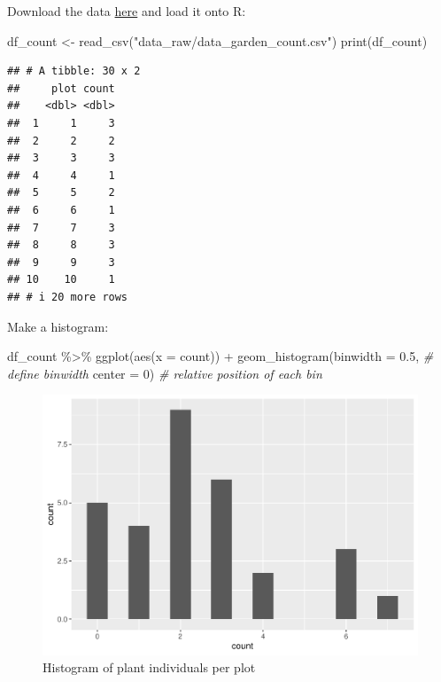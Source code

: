 \documentclass[
]{book}
\newenvironment{Shaded}{\begin{snugshade}}{\end{snugshade}}
\newcommand{\AttributeTok}[1]{\textcolor[rgb]{0.77,0.63,0.00}{#1}}
\newcommand{\CommentTok}[1]{\textcolor[rgb]{0.56,0.35,0.01}{\textit{#1}}}
\newcommand{\DecValTok}[1]{\textcolor[rgb]{0.00,0.00,0.81}{#1}}
\newcommand{\FloatTok}[1]{\textcolor[rgb]{0.00,0.00,0.81}{#1}}
\newcommand{\FunctionTok}[1]{\textcolor[rgb]{0.00,0.00,0.00}{#1}}
\newcommand{\NormalTok}[1]{#1}
\newcommand{\OtherTok}[1]{\textcolor[rgb]{0.56,0.35,0.01}{#1}}
\newcommand{\SpecialCharTok}[1]{\textcolor[rgb]{0.00,0.00,0.00}{#1}}
\newcommand{\StringTok}[1]{\textcolor[rgb]{0.31,0.60,0.02}{#1}}
\begin{document}
Download the data \href{https://github.com/aterui/biostats/blob/master/data_raw/data_garden_count.csv}{here} and load it onto R:

\begin{Shaded}
\begin{Highlighting}[]
\NormalTok{df\_count }\OtherTok{\textless{}{-}} \FunctionTok{read\_csv}\NormalTok{(}\StringTok{"data\_raw/data\_garden\_count.csv"}\NormalTok{)}
\FunctionTok{print}\NormalTok{(df\_count)}
\end{Highlighting}
\end{Shaded}

\begin{verbatim}
## # A tibble: 30 x 2
##     plot count
##    <dbl> <dbl>
##  1     1     3
##  2     2     2
##  3     3     3
##  4     4     1
##  5     5     2
##  6     6     1
##  7     7     3
##  8     8     3
##  9     9     3
## 10    10     1
## # i 20 more rows
\end{verbatim}

Make a histogram:

\begin{Shaded}
\begin{Highlighting}[]
\NormalTok{df\_count }\SpecialCharTok{\%\textgreater{}\%} 
  \FunctionTok{ggplot}\NormalTok{(}\FunctionTok{aes}\NormalTok{(}\AttributeTok{x =}\NormalTok{ count)) }\SpecialCharTok{+}
  \FunctionTok{geom\_histogram}\NormalTok{(}\AttributeTok{binwidth =} \FloatTok{0.5}\NormalTok{, }\CommentTok{\# define binwidth}
                 \AttributeTok{center =} \DecValTok{0}\NormalTok{) }\CommentTok{\# relative position of each bin}
\end{Highlighting}
\end{Shaded}

\begin{figure}

{\centering \includegraphics{_main_files/figure-latex/hist-density-1} 

}

\caption{Histogram of plant individuals per plot}\label{fig:hist-density}
\end{figure}
\end{document}
